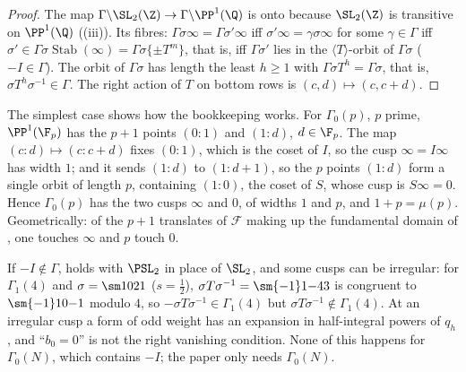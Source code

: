 \begin{proof}
The map $\Gamma\backslash\SL_2(\Z)\to\Gamma\backslash\PP^1(\Q)$ is onto because $\SL_2(\Z)$ is transitive on $\PP^1(\Q)$ ((iii)). Its fibres:
$\Gamma\sigma\infty=\Gamma\sigma'\infty$ iff $\sigma'\infty=\gamma\sigma\infty$ for some $\gamma\in\Gamma$ iff $\sigma'\in\Gamma\sigma\operatorname{Stab}(\infty)=\Gamma\sigma\{\pm T^m\}$, that is, iff
$\Gamma\sigma'$ lies in the $\langle T\rangle$-orbit of $\Gamma\sigma$ ($-I\in\Gamma$). The orbit of $\Gamma\sigma$ has length the least $h\ge1$ with $\Gamma\sigma T^h=\Gamma\sigma$, that is,
$\sigma T^h\sigma^{-1}\in\Gamma$. The right action of $T$ on bottom rows is $(c,d)\mapsto(c,c+d)$.
\end{proof}

The simplest case shows how the bookkeeping works. For $\Gamma_0(p)$, $p$ prime, $\PP^1(\F_p)$ has the $p+1$ points $(0:1)$ and $(1:d)$, $d\in\F_p$. The map $(c:d)\mapsto(c:c+d)$
fixes $(0:1)$, which is the coset of $I$, so the cusp $\infty=I\infty$ has width $1$; and it sends $(1:d)$ to $(1:d+1)$, so the $p$ points $(1:d)$ form a single orbit of length $p$,
containing $(1:0)$, the coset of $S$, whose cusp is $S\infty=0$. Hence $\Gamma_0(p)$ has the two cusps $\infty$ and $0$, of widths $1$ and $p$, and $1+p=\mu(p)$. Geometrically: of the
$p+1$ translates of $\mathcal F$ making up the fundamental domain of , one touches $\infty$ and $p$ touch $0$.

\begin{warning}\label{warn:modforms:irregular}
If $-I\notin\Gamma$,  holds with $\PSL_2$ in place of $\SL_2$, and some cusps can be irregular: for $\Gamma_1(4)$ and $\sigma=\sm1021$
($s=\frac12$), $\sigma T\sigma^{-1}=\sm{-1}1{-4}3$ is congruent to $\sm{-1}10{-1}$ modulo $4$, so $-\sigma T\sigma^{-1}\in\Gamma_1(4)$ but $\sigma T\sigma^{-1}\notin\Gamma_1(4)$. At an irregular
cusp a form of odd weight has an expansion in half-integral powers of $q_h$, and ``$b_0=0$'' is not the right vanishing condition. None of this happens
for $\Gamma_0(N)$, which contains $-I$; the paper only needs $\Gamma_0(N)$.
\end{warning}

